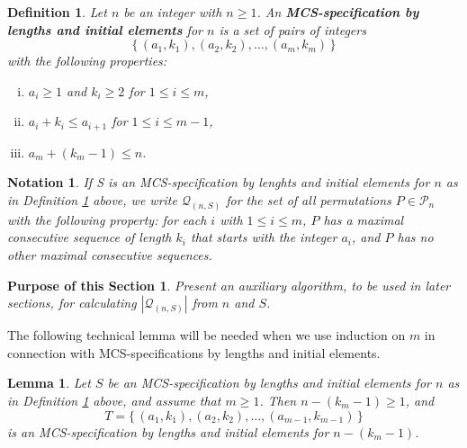 \documentclass{article}
\newtheorem{lemma}[theorem]{Lemma}
\newtheorem{definition}[theorem]{Definition}
\newtheorem{notation}[theorem]{Notation}
\newtheorem{purpose}{Purpose of this Section}
\begin{document}
\begin{definition} \label{def_mcs_spec_by_length_and_initial_element}
  Let $n$ be an integer with $n\geq 1$. An {\bf MCS-specification by lengths and initial elements} for $n$ is a
  set of pairs of integers $$\{\,(a_1, k_1), (a_2, k_2), \ldots,(a_m, k_m)\,\}$$ with the following properties:
  \begin{enumerate}[(i)]
  \item
    $a_i \geq 1$ and $k_i \geq 2$ for $1\leq i \leq m$,
  \item
    $a_i + k_i \leq a_{i+1}$ for $1\leq i \leq m-1$,
  \item
    $a_m + (k_m-1) \leq n$.
  \end{enumerate}
\end{definition}

\begin{notation}\label{notation_mcs_spec_by_length_and_initial_element}
  If S is an MCS-specification by lenghts and initial elements for $n$ as in
  Definition \ref{def_mcs_spec_by_length_and_initial_element}
  above, we write ${\mathcal Q}_{(n,S)}$ for the set of all permutations
  $P \in {\mathcal P}_n$ with the following property: for each $i$ with $1\leq i \leq m$, $P$ has a maximal
  consecutive sequence of length $k_i$ that starts with the integer $a_i$, and $P$ has no other maximal
  consecutive sequences.
\end{notation}

\begin{purpose}
Present an auxiliary algorithm, to be used in later sections,
for calculating $|{\mathcal Q}_{(n,S)}|$ from $n$ and $S$.
\end{purpose}

The following technical lemma will be needed when we use induction on $m$ in connection with
MCS-specifications by lengths and initial elements.

\begin{lemma}\label{lemma_ind_on_m} 
  Let $S$ be an MCS-specification by lengths and initial elements for $n$ as in
  Definition \ref{def_mcs_spec_by_length_and_initial_element}
  above, and assume that $m\geq 1$. Then $n-(k_m-1) \geq 1$, and
  $$T = \{\,(a_1, k_1), (a_2, k_2), \ldots,(a_{m-1}, k_{m-1})\,\}$$
  is an MCS-specification by lengths and initial elements for $n-(k_m-1)$.
\end{lemma}
\end{document}
